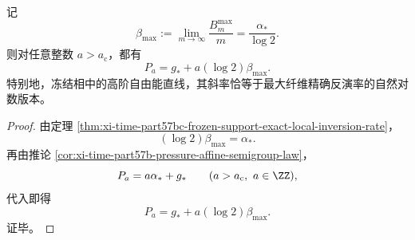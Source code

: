 \begin{corollary}[冻结斜率即编码斜率]\label{cor:xi-time-part57bc-freezing-slope-coding-rate}
记
\[
\beta_{\max}
:=
\lim_{m\to\infty}\frac{B_m^{\max}}{m}
=
\frac{\alpha_*}{\log 2}.
\]
则对任意整数 \(a>a_{\mathrm c}\)，都有
\[
P_a
=
g_*+a(\log 2)\beta_{\max}.
\]
特别地，冻结相中的高阶自由能直线，其斜率恰等于最大纤维精确反演率的自然对数版本。
\end{corollary}
\begin{proof}
由定理 \ref{thm:xi-time-part57bc-frozen-support-exact-local-inversion-rate}，
\[
(\log 2)\beta_{\max}=\alpha_*.
\]
再由推论 \ref{cor:xi-time-part57b-pressure-affine-semigroup-law}，
\[
P_a=a\alpha_*+g_*
\qquad
(a>a_{\mathrm c},\ a\in\ZZ),
\]
代入即得
\[
P_a=g_*+a(\log 2)\beta_{\max}.
\]
证毕。
\end{proof}

\endinput
